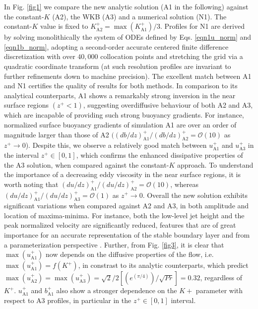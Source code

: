 %
In Fig. \ref{fig1} we compare the new analytic solution (A1 in the following) against the constant-$K$ (A2), the WKB (A3) and a numerical solution (N1).
The constant-$K$ value is fixed to $K^+_{\mathrm{A2}} = \max(K_{\mathrm{A1}}^+)/3$. 
Profiles for N1 are derived by solving monolithically the system of ODEs defined by Eqs. \ref{eqn1u_norm} and \ref{eqn1b_norm}, adopting a second-order accurate centered finite difference discretization with over $40,000$ collocation points and stretching the grid via a quadratic coordinate transform (at such resolution profiles are invariant to further refinements down to machine precision).
The excellent match between A1 and N1 certifies the quality of results for both methods. 
In comparison to its analytical counterparts, A1 shows a remarkably strong inversion in the near surface regions $(z^+ <1)$, suggesting overdiffusive behaviour of both A2 and A3, which are incapable of providing such strong buoyancy gradients. 
For instance, normalized surface buoyancy gradients of simulation A1 are over an order of magnitude larger than those of A2 $( (db/dz)^+_\mathrm{A1}/(db/dz)^+_\mathrm{A2} = \mathcal{O}(10)$ as $z^+ \rightarrow 0$).
Despite this, we observe a relatively good match between $u^+_\mathrm{A1}$ and $u^+_\mathrm{A3}$ in the interval $z^+ \in [0,1]$, which confirms the enhanced dissipative properties of the A3 solution, when compared against the constant-$K$ approach. 
To understand the importance of a decreasing eddy viscosity in the near surface regions, it is worth noting that $(du/dz)^+_\mathrm{A1}/(du/dz)^+_\mathrm{A2} = \mathcal{O}(10)$, whereas $(du/dz)^+_\mathrm{A1}/(du/dz)^+_\mathrm{A3}= \mathcal{O}(1)$ as $z^+ \rightarrow 0$.
Overall the new solution exhibits significant variations when compared against A2 and A3, in both amplitude and location of maxima-minima. 
For instance, both the low-level jet height and the peak normalized velocity are significantly reduced, features that are of great importance for an accurate representation of the stable boundary layer and from a parameterization perspective \citep{Mahrt1998}.
Further, from Fig. \ref{fig3}, it is clear that $\max{(u^+_\mathrm{A1})}$ now depends on the diffusive properties of the flow, i.e. $\max{(u^+_{\mathrm{A1}})} = f(K^+)$, in constrast to its analytic counterparts, which predict $\max{(u^+_\mathrm{A2})} = \max{(u^+_\mathrm{A3})} =  \sqrt{2}/2 [(e^{(\pi/4)})/\sqrt{Pr}] = 0.32$, regardless of $K^+$.
$u^+_{\mathrm{A1}}$ and $b^+_{\mathrm{A1}}$ also show a stronger dependence on the $K+$ parameter with respect to A3 profiles, in particular in the $z^+ \in [0,1]$ interval.

